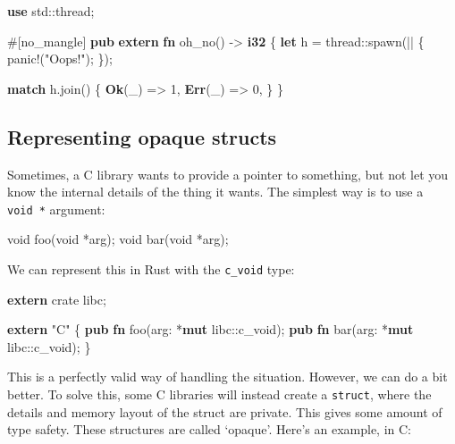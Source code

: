 \documentclass[a4paper,]{book}
\newenvironment{Shaded}{\begin{snugshade}}{\end{snugshade}}
\newcommand{\KeywordTok}[1]{\textcolor[rgb]{0.13,0.29,0.53}{\textbf{{#1}}}}
\newcommand{\DataTypeTok}[1]{\textcolor[rgb]{0.13,0.29,0.53}{{#1}}}
\newcommand{\DecValTok}[1]{\textcolor[rgb]{0.00,0.00,0.81}{{#1}}}
\newcommand{\StringTok}[1]{\textcolor[rgb]{0.31,0.60,0.02}{{#1}}}
\newcommand{\OtherTok}[1]{\textcolor[rgb]{0.56,0.35,0.01}{{#1}}}
\newcommand{\NormalTok}[1]{{#1}}
\begin{document}
\begin{Shaded}
\begin{Highlighting}[]
\KeywordTok{use} \NormalTok{std::thread;}

\OtherTok{#[}\NormalTok{no_mangle}\OtherTok{]}
\KeywordTok{pub} \KeywordTok{extern} \KeywordTok{fn} \NormalTok{oh_no() -> }\KeywordTok{i32} \NormalTok{\{}
    \KeywordTok{let} \NormalTok{h = thread::spawn(|| \{}
        \OtherTok{panic!}\NormalTok{(}\StringTok{"Oops!"}\NormalTok{);}
    \NormalTok{\});}

    \KeywordTok{match} \NormalTok{h.join() \{}
        \KeywordTok{Ok}\NormalTok{(_) => }\DecValTok{1}\NormalTok{,}
        \KeywordTok{Err}\NormalTok{(_) => }\DecValTok{0}\NormalTok{,}
    \NormalTok{\}}
\NormalTok{\}}
\end{Highlighting}
\end{Shaded}

\subsection{Representing opaque
structs}\label{representing-opaque-structs}

Sometimes, a C library wants to provide a pointer to something, but not
let you know the internal details of the thing it wants. The simplest
way is to use a \texttt{void\ *} argument:

\begin{Shaded}
\begin{Highlighting}[]
\DataTypeTok{void} \NormalTok{foo(}\DataTypeTok{void} \NormalTok{*arg);}
\DataTypeTok{void} \NormalTok{bar(}\DataTypeTok{void} \NormalTok{*arg);}
\end{Highlighting}
\end{Shaded}

We can represent this in Rust with the \texttt{c\_void} type:

\begin{Shaded}
\begin{Highlighting}[]
\KeywordTok{extern} \NormalTok{crate libc;}

\KeywordTok{extern} \StringTok{"C"} \NormalTok{\{}
    \KeywordTok{pub} \KeywordTok{fn} \NormalTok{foo(arg: *}\KeywordTok{mut} \NormalTok{libc::c_void);}
    \KeywordTok{pub} \KeywordTok{fn} \NormalTok{bar(arg: *}\KeywordTok{mut} \NormalTok{libc::c_void);}
\NormalTok{\}}
\end{Highlighting}
\end{Shaded}

This is a perfectly valid way of handling the situation. However, we can
do a bit better. To solve this, some C libraries will instead create a
\texttt{struct}, where the details and memory layout of the struct are
private. This gives some amount of type safety. These structures are
called `opaque'. Here's an example, in C:
\end{document}
